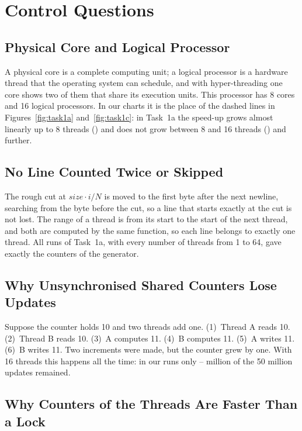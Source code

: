 \documentclass[12pt,a4paper]{article}
\begin{document}
\newpage
\section{Control Questions}

\subsection{Physical Core and Logical Processor}

A physical core is a complete computing unit; a logical processor is a hardware thread that the operating system can schedule, and with hyper-threading one core shows two of them that share its execution units. This processor has 8 cores and 16 logical processors. In our charts it is the place of the dashed lines in Figures~\ref{fig:task1a} and~\ref{fig:task1c}: in Task~1a the speed-up grows almost linearly up to 8 threads (\aSpeedEight) and does not grow between 8 and 16 threads (\aSpeedSixteen) and further.

\subsection{No Line Counted Twice or Skipped}

The rough cut at $\mathit{size}\cdot i/N$ is moved to the first byte after the next newline, searching from the byte before the cut, so a line that starts exactly at the cut is not lost. The range of a thread is from its start to the start of the next thread, and both are computed by the same function, so each line belongs to exactly one thread. All runs of Task~1a, with every number of threads from 1 to 64, gave exactly the counters of the generator.

\subsection{Why Unsynchronised Shared Counters Lose Updates}

Suppose the counter holds 10 and two threads add one. (1)~Thread A reads 10. (2)~Thread B reads 10. (3)~A computes 11. (4)~B computes 11. (5)~A writes 11. (6)~B writes 11. Two increments were made, but the counter grew by one. With 16 threads this happens all the time: in our runs only \bNoSyncCountMin--\bNoSyncCountMax{} million of the 50 million updates remained.

\subsection{Why Counters of the Threads Are Faster Than a Lock}
\end{document}
